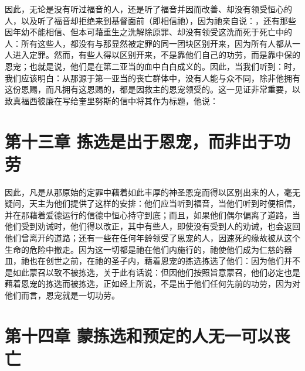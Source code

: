 因此，无论是没有听过福音的人，还是听了福音并因而改善、却没有领受恒心的人，以及听了福音却拒绝来到基督面前（即相信祂），因为祂亲自说：，还有那些因年幼不能相信、但本可藉重生之洗解除原罪、却没有领受这洗而死于死亡中的人：所有这些人，都没有与那显然被定罪的同一团块区别开来，因为所有人都从一人进入定罪。然而，有些人得以区别开来，不是靠他们自己的功劳，而是靠中保的恩宠；也就是说，他们是在第二亚当的血中白白成义的。因此，当我们听到：时，我们应该明白：从那源于第一亚当的丧亡群体中，没有人能与众不同，除非他拥有这份恩赐，而凡拥有这恩赐的，都是因救主的恩宠领受的。这一见证非常重要，以致真福西彼廉在写给奎里努斯的信中将其作为标题，他说：\par


\section{第十三章 拣选是出于恩宠，而非出于功劳}

因此，凡是从那原始的定罪中藉着如此丰厚的神圣恩宠而得以区别出来的人，毫无疑问，天主为他们提供了这样的安排：他们应当听到福音，当他们听到时便相信，并在那藉着爱德运行的信德中恒心持守到底；而且，如果他们偶尔偏离了道路，当他们受到劝诫时，他们得以改正，其中有些人，即使没有受到人的劝诫，也会返回他们曾离开的道路；还有一些在任何年龄领受了恩宠的人，因速死的缘故被从这个生命的危险中撤走。因为这一切都是祂在他们内施行的，祂使他们成为仁慈的器皿，祂也在创世之前，在祂的圣子内，藉着恩宠的拣选拣选了他们：因为他们并不是如此蒙召以致不被拣选，关于此有话说：但因他们按照旨意蒙召，他们必定也是藉着恩宠的拣选而被拣选，正如经上所说，不是出于他们任何先前的功劳，因为对他们而言，恩宠就是一切功劳。\par


\section{第十四章 蒙拣选和预定的人无一可以丧亡}

